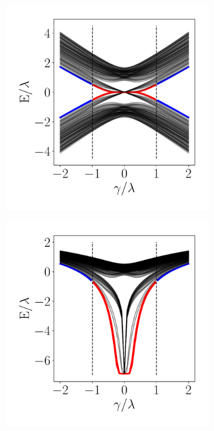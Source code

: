 \begin{figure}[h!]
     \begin{minipage}[h!]{0.9\textwidth}
         \begin{subfigure}[b!]{0.3 \textwidth}
             \caption{}
             \includegraphics[width=\textwidth]{Imagenes/Resultados_Hoti_Fractal/bands_square_shh_0.3.pdf}
             \label{}
         \end{subfigure}\hspace*{-0.5em}
         \begin{subfigure}[b!]{0.3 \textwidth}
             \caption{}
             \includegraphics[width=\textwidth]{Imagenes/Resultados_Hoti_Fractal/bands_square_shh_log0.3.pdf}

\end{subfigure}
\end{minipage}
\end{figure}

